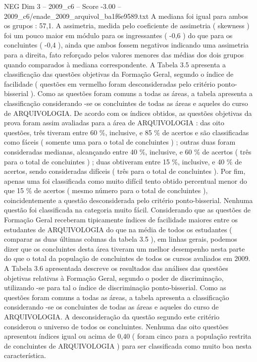 \begin{textsample}{NEG Dim 3 – 2009\_c6 – Score -3.00 – 2009\_c6/enade\_2009\_arquivol\_ba1f6e9589.txt}
A mediana foi igual para ambos os grupos : 57,1.
A assimetria, medida pelo coeficiente de assimetria ( skewness ) foi um pouco maior em módulo para os ingressantes ( -0,6 ) do que para os concluintes ( -0,4 ), ainda que ambos fossem negativos indicando uma assimetria para a direita, fato reforçado pelos valores menores das médias dos dois grupos quando comparados à mediana correspondente.
A Tabela 3.5 apresenta a classificação das questões objetivas da Formação Geral, segundo o índice de facilidade ( questões em vermelho foram desconsideradas pelo critério ponto-bisserial ).
Como as questões foram comuns a todas as áreas, a tabela apresenta a classificação considerando -se os concluintes de todas as áreas e aqueles do curso de ARQUIVOLOGIA.
De acordo com os índices obtidos, as questões objetivas da prova foram assim avaliadas para a área de ARQUIVOLOGIA : das oito questões, três tiveram entre 60 \%, inclusive, e 85 \% de acertos e são classificadas como fáceis ( somente uma para o total de concluintes ) ; outras duas foram consideradas medianas, alcançando entre 40 \%, inclusive, e 60 \% de acertos ( três para o total de concluintes ) ; duas obtiveram entre 15 \%, inclusive, e 40 \% de acertos, sendo consideradas difíceis ( três para o total de concluintes ).
Por fim, apenas uma foi classificada como muito difícil tento obtido percentual menor do que 15 \% de acertos ( mesmo número para o total de concluintes ), coincidentemente a questão desconsiderada pelo critério ponto-bisserial.
Nenhuma questão foi classificada na categoria muito fácil.
Considerando que as questões de Formação Geral receberam tipicamente índices de facilidade maiores entre os estudantes de ARQUIVOLOGIA do que na média de todos os estudantes ( comparar as duas últimas colunas da tabela 3.5 ), em linhas gerais, podemos dizer que os concluintes desta área tiveram um melhor desempenho nesta parte do que o total da população de concluintes de todos os cursos avaliados em 2009.
A Tabela 3.6 apresentada descreve os resultados das análises das questões objetivas relativas à Formação Geral, segundo o poder de discriminação, utilizando -se para tal o índice de discriminação ponto-bisserial.
Como as questões foram comuns a todas as áreas, a tabela apresenta a classificação considerando -se os concluintes de todas as áreas e aqueles do curso de ARQUIVOLOGIA.
A desconsideração da questão segundo este critério considerou o universo de todos os concluintes.
Nenhuma das oito questões apresentou índices igual ou acima de 0,40 ( foram cinco para a população restrita de concluintes de ARQUIVOLOGIA ) para ser classificada como muito boa nesta característica.

\end{textsample}
